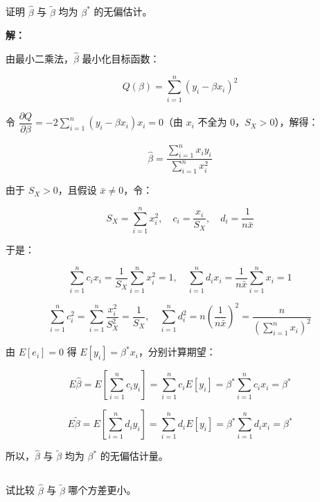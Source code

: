 \documentclass[12pt,a4paper]{article}
\begin{document}
\subsection{}

证明 $\hat{\beta}$ 与 $\widetilde{\beta}$ 均为 $\beta^*$ 的无偏估计。

\begin{answerbox}
\textbf{解：}

由最小二乘法，$\hat{\beta}$ 最小化目标函数：

$$
Q(\beta)=\sum_{i=1}^{n}(y_i-\beta x_i)^2
$$

令 $\dfrac{\partial Q}{\partial\beta}=-2\sum_{i=1}^{n}(y_i-\beta x_i)x_i=0$（由 $x_i$ 不全为 $0$，$S_X>0$），解得：

$$
\hat{\beta}=\frac{\sum_{i=1}^{n}x_iy_i}{\sum_{i=1}^{n}x_i^2}
$$

由于 $S_X>0$，且假设 $\bar{x}\neq 0$，令：

$$
S_X=\sum_{i=1}^{n}x_i^2, \quad c_i=\frac{x_i}{S_X}, \quad d_i = \frac{1}{n\bar{x}}
$$

于是：

$$
\sum_{i=1}^{n}c_ix_i=\frac{1}{S_X}\sum_{i=1}^{n}x_i^2=1, \quad \sum_{i=1}^{n}d_ix_i=\frac{1}{n\bar{x}}\sum_{i=1}^{n}x_i=1
$$

$$
\sum_{i=1}^{n}c_i^2=\sum_{i=1}^{n}\frac{x_i^2}{S_X^2}=\frac{1}{S_X}, \quad \sum_{i=1}^{n}d_i^2=n\left(\frac{1}{n\bar{x}}\right)^2=\frac{n}{\left(\sum_{i=1}^{n}x_i\right)^2}
$$

由 $E[e_i]=0$ 得 $E[y_i]=\beta^*x_i$，分别计算期望：

$$
E\hat{\beta}=E\left[\sum_{i=1}^{n}c_iy_i\right]=\sum_{i=1}^{n}c_iE[y_i]=\beta^*\sum_{i=1}^{n}c_ix_i=\beta^*
$$

$$
E\widetilde{\beta}=E\left[\sum_{i=1}^{n}d_iy_i\right]=\sum_{i=1}^{n}d_iE[y_i]=\beta^*\sum_{i=1}^{n}d_ix_i=\beta^*
$$

所以，$\hat{\beta}$ 与 $\widetilde{\beta}$ 均为 $\beta^*$ 的无偏估计量。

\end{answerbox}

\subsection{}

试比较 $\hat{\beta}$ 与 $\widetilde{\beta}$ 哪个方差更小。
\end{document}
